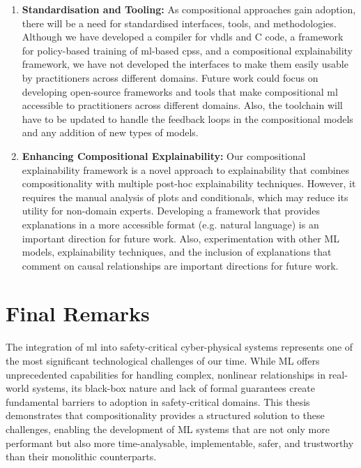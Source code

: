 \begin{enumerate}
    
    \item \textbf{Standardisation and Tooling:} As compositional approaches gain adoption, there will be a need for standardised interfaces, tools, and methodologies. Although we have developed a compiler for \glspl{vhdl} and C code, a framework for policy-based training of \gls{ml}-based \glspl{cps}, and a compositional explainability framework, we have not developed the interfaces to make them easily usable by practitioners across different domains. Future work could focus on developing open-source frameworks and tools that make compositional \gls{ml} accessible to practitioners across different domains. Also, the toolchain will have to be updated to handle the feedback loops in the compositional models and any addition of new types of models.
    
    \item \textbf{Enhancing Compositional Explainability:} Our compositional explainability framework is a novel approach to explainability that combines compositionality with multiple post-hoc explainability techniques. However, it requires the manual analysis of plots and conditionals, which may reduce its utility for non-domain experts. Developing a framework that provides explanations in a more accessible format (e.g. natural language) is an important direction for future work. Also, experimentation with other ML models, explainability techniques, and the inclusion of explanations that comment on causal relationships are important directions for future work.

\end{enumerate}

\section{Final Remarks}

The integration of \gls{ml} into safety-critical cyber-physical systems represents one of the most significant technological challenges of our time. While ML offers unprecedented capabilities for handling complex, nonlinear relationships in real-world systems, its black-box nature and lack of formal guarantees create fundamental barriers to adoption in safety-critical domains. This thesis demonstrates that compositionality provides a structured solution to these challenges, enabling the development of ML systems that are not only more performant but also more time-analysable, implementable, safer, and trustworthy than their monolithic counterparts.

